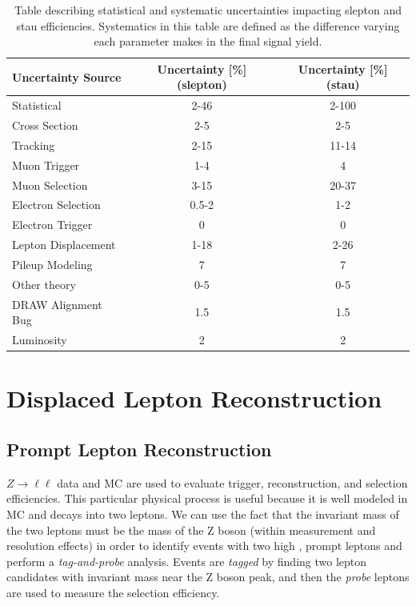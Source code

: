 \begin{table}[htb]
\small
\begin{center}
\begin{tabular}{lcc}
Uncertainty Source & Uncertainty [\%] (slepton)  &  Uncertainty [\%] (stau)  \\
\hline
Statistical				& 2-46    & 2-100                 \\
Cross Section 			& 2-5     & 2-5                 \\
Tracking				& 2-15    & 11-14                 \\
Muon Trigger			& 1-4     & 4            \\
Muon Selection	        & 3-15    & 20-37          \\
Electron Selection      & 0.5-2   & 1-2    \\
Electron Trigger	    & 0       & 0       \\
Lepton Displacement  	& 1-18    & 2-26         \\
Pileup Modeling     	& 7       & 7            \\
Other theory         	& 0-5     & 0-5              \\
DRAW Alignment Bug		& 1.5     & 1.5          \\
Luminosity				& 2       & 2          \\
\hline
\end{tabular}
\caption{Table describing statistical and systematic uncertainties impacting slepton and stau efficiencies. Systematics in this table are defined as the difference varying each parameter makes in the final signal yield.} 
\label{tab:siguncertainties}
\end{center}
\end{table}


\section{Displaced Lepton Reconstruction}

\subsection{Prompt Lepton Reconstruction}
$Z\rightarrow\ell\ell$ data and \ac{MC} are used to evaluate trigger, reconstruction, and selection efficiencies. This particular physical process is useful because it is well modeled in \ac{MC} and decays into two leptons. We can use the fact that the invariant mass of the two leptons must be the mass of the Z boson (within measurement and resolution effects) in order to identify events with two high \pt, prompt leptons and perform a \emph{tag-and-probe} analysis. Events are \emph{tagged} by finding two lepton candidates with invariant mass near the Z boson peak, and then the \emph{probe} leptons are used to measure the selection efficiency.


